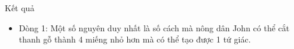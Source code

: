 Kết quả  
\begin{itemize}
	\item     Dòng 1: Một số nguyên duy nhất là số cách mà nông dân John         có thể cắt thanh gỗ thành 4 miếng nhỏ hơn mà có thể tạo được 1 tứ giác.   
\end{itemize}
